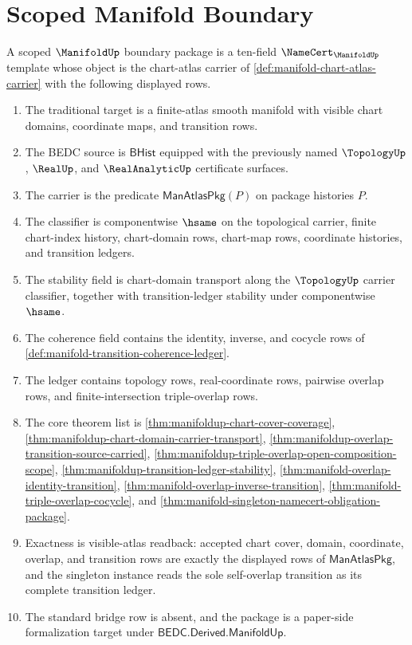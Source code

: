 \section{Scoped Manifold Boundary}
\label{sec:manifold-scoped-boundary}

\begin{definition}
\label{def:manifold-scoped-boundary-package}
A scoped $\ManifoldUp$ boundary package is a ten-field
$\NameCert_{\ManifoldUp}$ template whose object is the chart-atlas carrier of
\autoref{def:manifold-chart-atlas-carrier} with the following displayed rows.
\begin{enumerate}
\item The traditional target is a finite-atlas smooth manifold with visible
chart domains, coordinate maps, and transition rows.
\item The BEDC source is $\mathsf{BHist}$ equipped with the previously named
$\TopologyUp$, $\RealUp$, and $\RealAnalyticUp$ certificate surfaces.
\item The carrier is the predicate $\mathsf{ManAtlasPkg}(P)$ on package
histories $P$.
\item The classifier is componentwise $\hsame$ on the topological carrier,
finite chart-index history, chart-domain rows, chart-map rows, coordinate
histories, and transition ledgers.
\item The stability field is chart-domain transport along the $\TopologyUp$
carrier classifier, together with transition-ledger stability under
componentwise $\hsame$.
\item The coherence field contains the identity, inverse, and cocycle rows of
\autoref{def:manifold-transition-coherence-ledger}.
\item The ledger contains topology rows, real-coordinate rows, pairwise
overlap rows, and finite-intersection triple-overlap rows.
\item The core theorem list is
\autoref{thm:manifoldup-chart-cover-coverage},
\autoref{thm:manifoldup-chart-domain-carrier-transport},
\autoref{thm:manifoldup-overlap-transition-source-carried},
\autoref{thm:manifoldup-triple-overlap-open-composition-scope},
\autoref{thm:manifoldup-transition-ledger-stability},
\autoref{thm:manifold-overlap-identity-transition},
\autoref{thm:manifold-overlap-inverse-transition},
\autoref{thm:manifold-triple-overlap-cocycle}, and
\autoref{thm:manifold-singleton-namecert-obligation-package}.
\item Exactness is visible-atlas readback: accepted chart cover, domain,
coordinate, overlap, and transition rows are exactly the displayed rows of
$\mathsf{ManAtlasPkg}$, and the singleton instance reads the sole self-overlap
transition as its complete transition ledger.
\item The standard bridge row is absent, and the package is a paper-side
formalization target under $\mathsf{BEDC.Derived.ManifoldUp}$.
\end{enumerate}
\end{definition}

